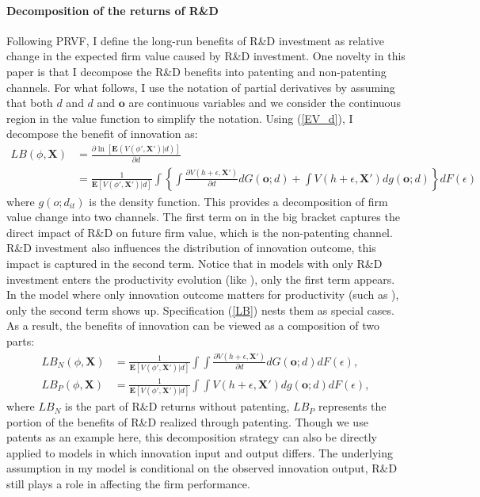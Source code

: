 \paragraph{Decomposition of the returns of R\&D} 
Following PRVF, I define the long-run benefits of R\&D investment as relative change in the expected firm value caused by R\&D investment. One novelty in this paper is that I decompose the R\&D benefits into patenting and non-patenting channels. For what follows, I use the notation of partial derivatives by assuming that both $d$ and $d$ and $\mathbf{o}$ are continuous variables and we consider the continuous region in the value function to simplify the notation. Using (\ref{EV_d}), I decompose the benefit of innovation as:
\begin{align}  \label{LB}
    LB(\phi,\mathbf{X})& = \frac{\partial \ln[\mathbf{E}(V(\phi',\mathbf{X}')|d)]}{\partial d} \\
                       & = \frac{1}{\mathbf{E}[V(\phi',\mathbf{X}')|d]} \int \left\{ \int \frac{\partial V(h+\epsilon,\mathbf{X}')}{\partial d}dG(\mathbf{o};d) + \int V(h+\epsilon,\mathbf{X}')dg(\mathbf{o};d) \right \}dF(\epsilon) \nonumber
\end{align}
where $g(o;d_{it})$ is the density function. This provides a decomposition of firm value change into two channels. The first term on in the big bracket captures the direct impact of R\&D on future firm value, which is the non-patenting channel. R\&D investment also influences the distribution of innovation outcome, this impact is captured in the second term. Notice that in models with only R\&D investment enters the productivity evolution (like \citet{Doraszelski2013}), only the first term appears. In the model where only innovation outcome matters for productivity (such as \citet{Peters2017}), only the second term shows up. Specification (\ref{LB}) nests them as special cases. As a result, the benefits of innovation can be viewed as a composition of two parts:
\begin{align}
    LB_{N}(\phi,\mathbf{X})&= \frac{1}{\mathbf{E}[V(\phi',\mathbf{X}')|d]} \int\int \frac{\partial V(h+\epsilon,\mathbf{X}')}{\partial d}dG(\mathbf{o};d)dF(\epsilon), \\
    LB_{P}(\phi, \mathbf{X})&=   \frac{1}{\mathbf{E} [V(\phi',\mathbf{X}')|d]}\int\int V(h+\epsilon,\mathbf{X}')dg(\mathbf{o};d)dF(\epsilon), \label{LB_P}
\end{align}
where $LB_{N}$ is the part of R\&D returns without patenting, $LB_{P}$ represents the portion of the benefits of R\&D realized through patenting. Though we use patents as an example here, this decomposition strategy can also be directly applied to models in which innovation input and output differs. The underlying assumption in my model is conditional on the observed innovation output, R\&D still plays a role in affecting the firm performance.
